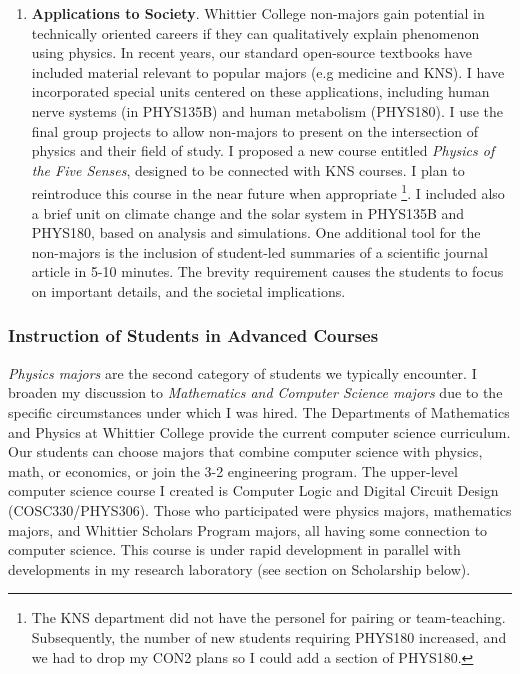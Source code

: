 \documentclass[../../main.tex]{subfiles}
\begin{document}
\begin{enumerate}
\item \textbf{Applications to Society}. Whittier College non-majors gain potential in technically oriented careers if they can qualitatively explain phenomenon using physics.  In recent years, our standard open-source textbooks have included material relevant to popular majors (e.g medicine and KNS). I have incorporated special units centered on these applications, including human nerve systems (in PHYS135B) and human metabolism (PHYS180).  I use the final group projects to allow non-majors to present on the intersection of physics and their field of study.  I proposed a new course entitled \textit{Physics of the Five Senses}, designed to be connected with KNS courses.  I plan to reintroduce this course in the near future when appropriate \footnote{The KNS department did not have the personel for pairing or team-teaching.  Subsequently, the number of new students requiring PHYS180 increased, and we had to drop my CON2 plans so I could add a section of PHYS180.}. I included also a brief unit on climate change and the solar system in PHYS135B and PHYS180, based on analysis and simulations.  One additional tool for the non-majors is the inclusion of student-led summaries of a scientific journal article in 5-10 minutes.  The brevity requirement causes the students to focus on important details, and the societal implications.
\end{enumerate}

\subsubsection{Instruction of Students in Advanced Courses}

\label{sec:teaching_phil2}

\textit{Physics majors} are the second category of students we typically encounter.  I broaden my discussion to \textit{Mathematics and Computer Science majors} due to the specific circumstances under which I was hired.  The Departments of Mathematics and Physics at Whittier College provide the current computer science curriculum.  Our students can choose majors that combine computer science with physics, math, or economics, or join the 3-2 engineering program.  The upper-level computer science course I created is Computer Logic and Digital Circuit Design (COSC330/PHYS306).  Those who participated were physics majors, mathematics majors, and Whittier Scholars Program majors, all having some connection to computer science.  This course is under rapid development in parallel with developments in my research laboratory (see section on Scholarship below). \\ \hspace{0.1cm}
\end{document}
